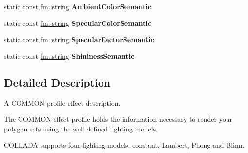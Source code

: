 \begin{DoxyCompactItemize}
\item 
\hypertarget{classFCDEffectStandard_a85cfe6b55efc19e678b11f0d74686a62}{
static const \hyperlink{classfm_1_1stringT}{fm::string} {\bfseries AmbientColorSemantic}}
\label{classFCDEffectStandard_a85cfe6b55efc19e678b11f0d74686a62}

\item 
\hypertarget{classFCDEffectStandard_a0db5a8e39550be273a04a893c2aeb1f9}{
static const \hyperlink{classfm_1_1stringT}{fm::string} {\bfseries SpecularColorSemantic}}
\label{classFCDEffectStandard_a0db5a8e39550be273a04a893c2aeb1f9}

\item 
\hypertarget{classFCDEffectStandard_ae7bb65e68aaf9a9277139fdc84af9b57}{
static const \hyperlink{classfm_1_1stringT}{fm::string} {\bfseries SpecularFactorSemantic}}
\label{classFCDEffectStandard_ae7bb65e68aaf9a9277139fdc84af9b57}

\item 
\hypertarget{classFCDEffectStandard_ad0047e7193363514924cf4cb5836e2cb}{
static const \hyperlink{classfm_1_1stringT}{fm::string} {\bfseries ShininessSemantic}}
\label{classFCDEffectStandard_ad0047e7193363514924cf4cb5836e2cb}

\end{DoxyCompactItemize}


\subsection{Detailed Description}
A COMMON profile effect description.

The COMMON effect profile holds the information necessary to render your polygon sets using the well-\/defined lighting models.

COLLADA supports four lighting models: constant, Lambert, Phong and Blinn. 

